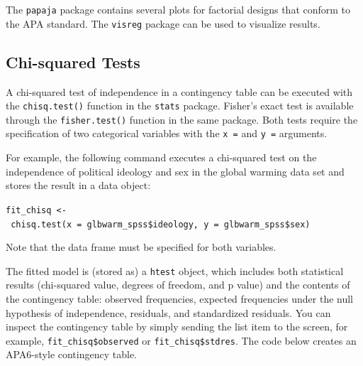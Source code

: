 \documentclass[doc,floatsintext]{apa6}
\begin{document}
The \texttt{papaja} package contains several plots for factorial designs
that conform to the APA standard. The \texttt{visreg} package can be
used to visualize results.

\subsection{Chi-squared Tests}\label{chisquared}

A chi-squared test of independence in a contingency table can be
executed with the \texttt{chisq.test()} function in the \texttt{stats}
package. Fisher's exact test is available through the
\texttt{fisher.test()} function in the same package. Both tests require
the specification of two categorical variables with the \texttt{x\ =}
and \texttt{y\ =} arguments.

For example, the following command executes a chi-squared test on the
independence of political ideology and sex in the global warming data
set and stores the result in a data object:

\texttt{fit\_chisq\ \textless{}-\ chisq.test(x\ =\ glbwarm\_spss\$ideology,\ y\ =\ glbwarm\_spss\$sex)}

Note that the data frame must be specified for both variables.

The fitted model is (stored as) a \texttt{htest} object, which includes
both statistical results (chi-squared value, degrees of freedom, and p
value) and the contents of the contingency table: observed frequencies,
expected frequencies under the null hypothesis of independence,
residuals, and standardized residuals. You can inspect the contingency
table by simply sending the list item to the screen, for example,
\texttt{fit\_chisq\$observed} or \texttt{fit\_chisq\$stdres}. The code
below creates an APA6-style contingency table.
\end{document}
